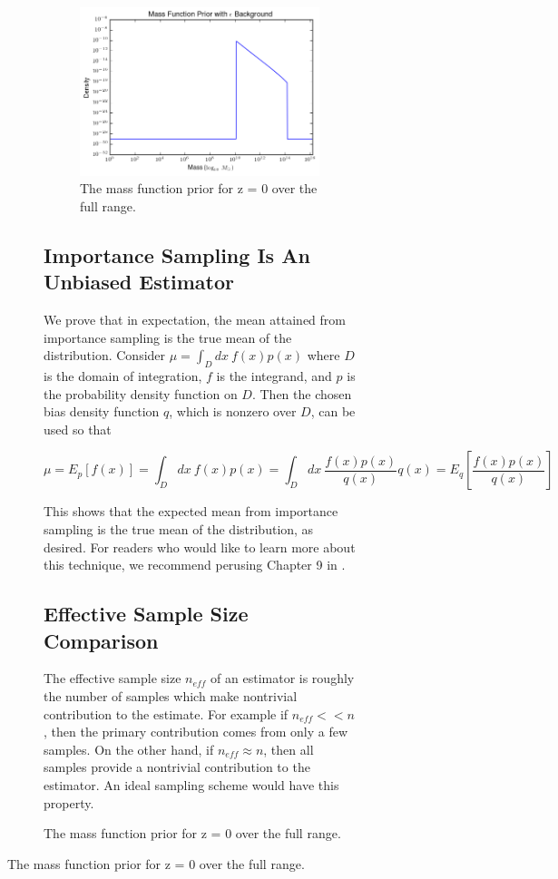 \documentclass[\docopts]{\docclass}
\begin{document}
\begin{figure}[h!]
\begin{figure}[h!]
\begin{figure}[h]
\centering
\includegraphics[width=0.6\columnwidth]{epsback.png}
\caption{
The mass function prior for z = 0 over the full range.
\label{fig:epsback}}
\end{figure}

\newpage

\subsection{Importance Sampling Is An Unbiased Estimator}
\label{subsec:is_unbiased}

We prove that in expectation, the mean attained from importance sampling is the true mean of the distribution.
Consider $\mu = \int_D dx\ f(x)p(x)$ where $D$ is the domain of integration, $f$ is the integrand, and $p$ is the probability density function on $D$. Then the chosen bias density function $q$, which is nonzero over $D$, can be used so that

$$\mu = E_p[f(x)] = \int_D dx\ f(x)p(x) = \int_D dx\ \frac{f(x)p(x)}{q(x)}q(x) = E_q\left[\frac{f(x)p(x)}{q(x)}\right]$$ 

\noindent This shows that the expected mean from importance sampling is the true mean of the distribution, as desired.
For readers who would like to learn more about this technique, we recommend perusing Chapter 9 in \citealt{mcbook}.

\newpage

\subsection{Effective Sample Size Comparison}
\label{subsec:is_ess}

The effective sample size $n_{eff}$ of an estimator is roughly the number of samples which make nontrivial contribution to the estimate. For example if $n_{eff} << n$, then the primary contribution comes from only a few samples. On the other hand, if $n_{eff} \approx n$, then all samples provide a nontrivial contribution to the estimator. An ideal sampling scheme would have this property. 


\end{figure}
\end{figure}
\end{document}
